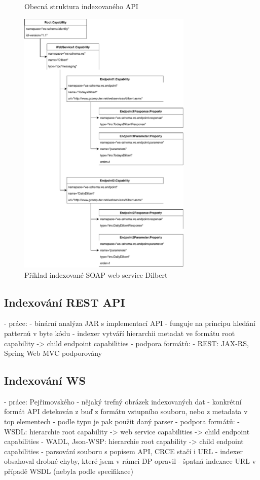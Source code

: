 \documentclass[czech,DP]{thesiskiv}
\begin{document}
\begin{figure}[h]
	\centering
	\caption{Obecná struktura indexovaného API}
	\label{fig:indexed-api-general}
\end{figure}

 \begin{figure}[h]
	\centering
	\includegraphics[height=13cm]{indexed-api-example}
	\caption{Příklad indexované SOAP web service Dilbert }
	\label{fig:indexed-api-example}
\end{figure}

\subsection{Indexování REST API}

- práce: \cite{hessova2015rest}
- binární analýza JAR s implementací API
- funguje na principu hledání patternů v byte kódu
- indexer vytváří hierarchii metadat ve formátu root capability -> child endpoint capabilities
- podpora formátů:
	- REST: JAX-RS, Spring Web MVC podporovány

\subsection{Indexování WS}

- práce: Pejřimovského \cite{pejrimovsky2015ws}
- nějaký trefný obrázek indexovaných dat
- konkrétní formát API detekován z buď z formátu vstupního souboru, nebo z metadata v top elementech
- podle typu je pak použit daný parser
- podpora formátů:
	- WSDL: hierarchie root capability -> web service capabilities -> child endpoint capabilities
	- WADL, Json-WSP: hierarchie root capability -> child endpoint capabilities
	- parsování souboru s popisem API, CRCE stačí i URL
- indexer obsahoval drobné chyby, které jsem v rámci DP opravil
	- špatná indexace URL v případě WSDL (nebyla podle specifikace)
\end{document}
